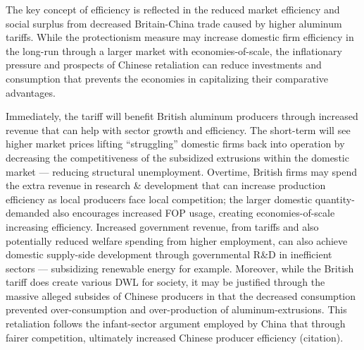 \documentclass[a4paper,12pt]{article}
\begin{document}
The key concept of efficiency is reflected in the reduced market efficiency and social surplus from decreased Britain-China trade caused by higher aluminum tariffs. While the protectionism measure may increase domestic firm efficiency in the long-run through a larger market with economies-of-scale, the inflationary pressure and prospects of Chinese retaliation can reduce investments and consumption that prevents the economies in capitalizing their comparative advantages.

Immediately, the tariff will benefit British aluminum producers through increased revenue that can help with sector growth and efficiency. The short-term will see higher market prices lifting ``struggling'' domestic firms back into operation by decreasing the competitiveness of the subsidized extrusions within the domestic market --- reducing structural unemployment. Overtime, British firms may spend the extra revenue in research \& development that can increase production efficiency as local producers face local competition; the larger domestic quantity-demanded also encourages increased FOP usage, creating economies-of-scale increasing efficiency.
Increased government revenue, from tariffs and also potentially reduced welfare spending from higher employment, can also achieve domestic supply-side development through governmental R\&D in inefficient sectors --- subsidizing renewable energy for example. Moreover, while the British tariff does create various DWL for society, it may be justified through the massive alleged subsides of Chinese producers in that the decreased consumption prevented over-consumption and over-production of aluminum-extrusions. This retaliation follows the infant-sector argument employed by China that through fairer competition, ultimately increased Chinese producer efficiency (citation).
\end{document}
